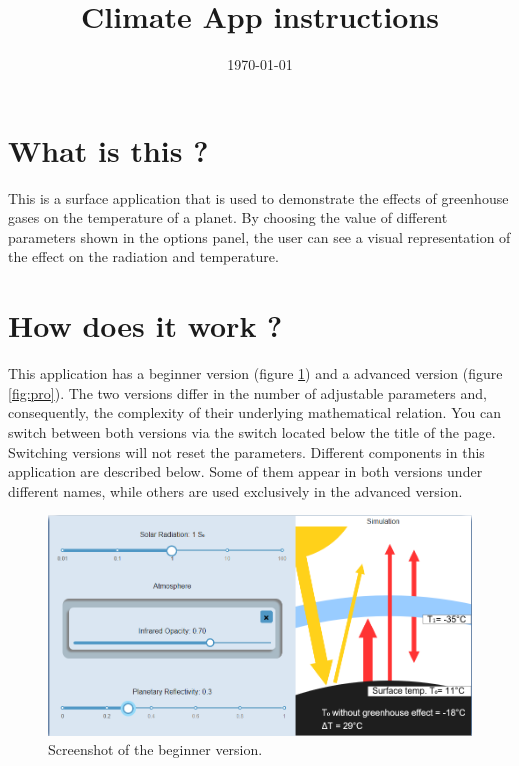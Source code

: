 \documentclass[a4paper,12pt]{article}
\title{\vspace{-2.0cm}Climate App instructions\vspace{-2.0cm}}
\date{\today}
\begin{document}
\maketitle
\thispagestyle{fancy}

\section*{What is this ?}

This is a surface application that is used to demonstrate the effects of greenhouse gases on the temperature of a planet. By choosing the value of different parameters shown in the options panel, the user can see a visual representation of the effect on the radiation and temperature. 

\section*{How does it work ?}

This application has a beginner version (figure \ref{fig:ped}) and a advanced version (figure \ref{fig:pro}). The two versions differ in the number of adjustable parameters and, consequently, the complexity of their underlying mathematical relation. You can switch between both versions via the switch located below the title of the page. Switching versions will not reset the parameters. Different components in this application are described below. Some of them appear in both versions under different names, while others are used exclusively in the advanced version.

\begin{figure}[h]
    \centering
    \includegraphics[width=\textwidth]{Ped.PNG}
    \caption{Screenshot of the beginner version.}
    \label{fig:ped}
\end{figure}
\end{document}
